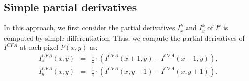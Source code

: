 \documentclass[twoside]{article}
\begin{document}
\subsection{Simple partial derivatives}
\label{Simple partial derivative}

In this approach, we first consider the partial derivatives $I^k_x$ and $I^k_y$ of $I^k$ 
is computed by simple differentiation. Thus, we compute the partial derivatives of $I^{CFA}$ 
at each pixel $P(x,y)$ as:
\begin{equation}
	\begin{array}{rcl}
		I^{CFA}_x(x,y) &=& \frac{1}{2} \cdot \left( I^{CFA}(x+1,y) - I^{CFA}(x-1,y) \right) \text{,} \\
		I^{CFA}_y(x,y) &=& \frac{1}{2} \cdot \left( I^{CFA}(x,y-1) - I^{CFA}(x,y+1) \right) \text{.}
	\end{array}
	\label{eq:partial_cfa_derivatives}
\end{equation}
\end{document}
